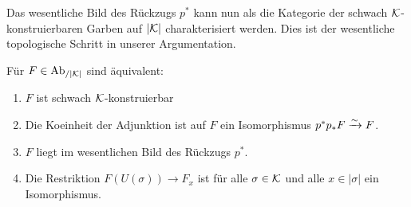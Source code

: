 Das wesentliche Bild des Rückzugs $p^*$ kann nun als die Kategorie der
schwach $\mathcal{K}$-konstruierbaren Garben auf $|\mathcal{K}|$ charakterisiert
werden. Dies ist der wesentliche topologische Schritt in unserer
Argumentation.
\begin{prop}[\cite{WS}, 8.4.6.3] \label{sk-char}
  Für $F \in \operatorname{Ab}_{/|\mathcal{K}|}$ sind äquivalent:
  \begin{enumerate}[label=(\arabic*)]
  \item \label{itm:sk-char-sk} $F$ ist schwach $\mathcal{K}$-konstruierbar
  \item \label{itm:sk-char-counit} Die Koeinheit der Adjunktion ist
    auf $F$ ein Isomorphismus $p^*p_*F \xrightarrow[]{\sim} F$.
  \item \label{itm:sk-char-essim} $F$ liegt im wesentlichen Bild des
    Rückzugs $p^*$.
  \item \label{itm:sk-char-res} Die Restriktion $F(U(\sigma)) \to F_x$
    ist für alle $\sigma \in \mathcal{K}$ und alle $x \in |\sigma|$ ein
    Isomorphismus.
  \end{enumerate}
\end{prop}
